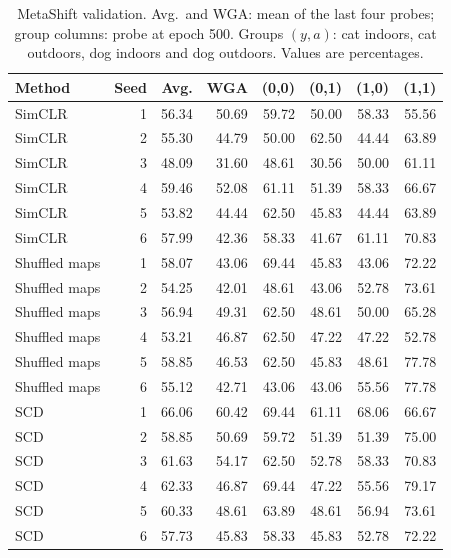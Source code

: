 \documentclass{article}
\begin{document}
\begin{table}[htbp]
\centering\small
\setlength{\tabcolsep}{4pt}
\caption{MetaShift validation. Avg.\ and WGA: mean of the last four probes; group columns: probe at epoch 500. Groups $(y,a)$: cat indoors, cat outdoors, dog indoors and dog outdoors. Values are percentages.}
\begin{tabular}{lrrrrrrr}
\toprule
Method & Seed & Avg. & WGA & (0,0) & (0,1) & (1,0) & (1,1) \\
\midrule
SimCLR & 1 & 56.34 & 50.69 & 59.72 & 50.00 & 58.33 & 55.56 \\
SimCLR & 2 & 55.30 & 44.79 & 50.00 & 62.50 & 44.44 & 63.89 \\
SimCLR & 3 & 48.09 & 31.60 & 48.61 & 30.56 & 50.00 & 61.11 \\
SimCLR & 4 & 59.46 & 52.08 & 61.11 & 51.39 & 58.33 & 66.67 \\
SimCLR & 5 & 53.82 & 44.44 & 62.50 & 45.83 & 44.44 & 63.89 \\
SimCLR & 6 & 57.99 & 42.36 & 58.33 & 41.67 & 61.11 & 70.83 \\
\addlinespace
Shuffled maps & 1 & 58.07 & 43.06 & 69.44 & 45.83 & 43.06 & 72.22 \\
Shuffled maps & 2 & 54.25 & 42.01 & 48.61 & 43.06 & 52.78 & 73.61 \\
Shuffled maps & 3 & 56.94 & 49.31 & 62.50 & 48.61 & 50.00 & 65.28 \\
Shuffled maps & 4 & 53.21 & 46.87 & 62.50 & 47.22 & 47.22 & 52.78 \\
Shuffled maps & 5 & 58.85 & 46.53 & 62.50 & 45.83 & 48.61 & 77.78 \\
Shuffled maps & 6 & 55.12 & 42.71 & 43.06 & 43.06 & 55.56 & 77.78 \\
\addlinespace
SCD & 1 & 66.06 & 60.42 & 69.44 & 61.11 & 68.06 & 66.67 \\
SCD & 2 & 58.85 & 50.69 & 59.72 & 51.39 & 51.39 & 75.00 \\
SCD & 3 & 61.63 & 54.17 & 62.50 & 52.78 & 58.33 & 70.83 \\
SCD & 4 & 62.33 & 46.87 & 69.44 & 47.22 & 55.56 & 79.17 \\
SCD & 5 & 60.33 & 48.61 & 63.89 & 48.61 & 56.94 & 73.61 \\
SCD & 6 & 57.73 & 45.83 & 58.33 & 45.83 & 52.78 & 72.22 \\
\bottomrule
\end{tabular}
\end{table}
\end{document}
